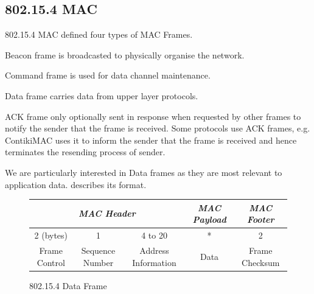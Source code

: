 \subsection{802.15.4 MAC} \label{Subsec: 802.15.4 MAC}
802.15.4 MAC defined four types of MAC Frames.
\begin{description}[style=nextline]
	\item[\textbf{Beacon}] 
	Beacon frame is broadcasted to physically organise the network.
	\item[\textbf{Command}] 
	Command frame is used for data channel maintenance.
	\item[\textbf{Data}] 
	Data frame carries data from upper layer protocols.
	\item[\textbf{ACK}] 
	ACK frame only optionally sent in response when requested by other frames to notify the sender that the frame is received. Some protocols use ACK frames, e.g. ContikiMAC uses it to inform the sender that the frame is received and hence terminates the resending process of sender.
\end{description}

We are particularly interested in Data frames as they are most relevant to application data.  describes its format.

\begin{figure}[th!]
	\centering
	\begin{tabular}{|c|c|c|c|c|}
		\multicolumn{3}{c}{\textit{MAC Header}}                           & \multicolumn{1}{c}{\textit{MAC Payload}} & \multicolumn{1}{c}{\textit{MAC Footer}}     \\ \hline
		2 (bytes)     & 1                    & 4 to 20              & *           & 2              \\ \hline
		Frame Control & Sequence Number & Address Information & Data        & Frame Checksum \\ \hline
	\end{tabular}
	\caption{802.15.4 Data Frame}
	\label{Fig: 802154 Data Frame}
\end{figure}


